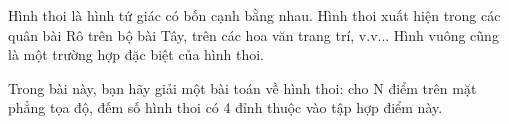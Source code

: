 Hình thoi là hình tứ giác có bốn cạnh bằng nhau. Hình thoi   xuất hiện trong các quân bài Rô trên bộ bài Tây, trên các hoa   văn trang trí, v.v... Hình vuông cũng là một trường hợp đặc biệt của hình thoi.  

   Trong bài này, bạn hãy giải một bài toán về hình thoi: cho   N điểm trên mặt phẳng tọa độ, đếm số hình thoi có 4 đỉnh   thuộc vào tập hợp điểm này.  

\